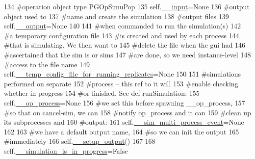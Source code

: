 \begin{DoxyCode}
134         \textcolor{comment}{#operation object type PGOpSimuPop}
135         self.\hyperlink{classnegui_1_1pgguisimupop_1_1PGGuiSimuPop_a0b9f7d933b428393d34105828600a007}{\_\_input}=\textcolor{keywordtype}{None}
136         \textcolor{comment}{#output object used to}
137         \textcolor{comment}{#name and create the simulation}
138         \textcolor{comment}{#output files}
139         self.\hyperlink{classnegui_1_1pgguisimupop_1_1PGGuiSimuPop_a30f6eabf78230001520f90cb36de339f}{\_\_output}=\textcolor{keywordtype}{None}
140 
141         \textcolor{comment}{#when commanded to run the simulation(s)}
142         \textcolor{comment}{#a temporary configuration file}
143         \textcolor{comment}{#is created and used by each process}
144         \textcolor{comment}{#that is simulating.  We then want to}
145         \textcolor{comment}{#delete the file when the gui had }
146         \textcolor{comment}{#ascertained that the sim is or sims}
147         \textcolor{comment}{#are done, so we need instance-level}
148         \textcolor{comment}{#access to the file name}
149         self.\hyperlink{classnegui_1_1pgguisimupop_1_1PGGuiSimuPop_a60c4be477f462c6981a08c479c20a893}{\_\_temp\_config\_file\_for\_running\_replicates}=\textcolor{keywordtype}{None}
150 
151         \textcolor{comment}{#simulations performed on separate}
152         \textcolor{comment}{#process -- this ref to it will}
153         \textcolor{comment}{#enable checking whether in progress}
154         \textcolor{comment}{#or finished.  See def runSimulation:}
155         self.\hyperlink{classnegui_1_1pgguisimupop_1_1PGGuiSimuPop_acdcfde3516741c64806c6881f65c6f4e}{\_\_op\_process}=\textcolor{keywordtype}{None}
156         \textcolor{comment}{#we set this before spawning \_\_op\_process,}
157         \textcolor{comment}{#so that on cancel-sim, we can}
158         \textcolor{comment}{#notify op\_process and it can }
159         \textcolor{comment}{#clean up its subprocesses and }
160         \textcolor{comment}{#output:}
161         self.\hyperlink{classnegui_1_1pgguisimupop_1_1PGGuiSimuPop_a02ccc7da9aec67e8e13e083001aba15b}{\_\_sim\_multi\_process\_event}=\textcolor{keywordtype}{None}
162 
163         \textcolor{comment}{#we have a default output name,}
164         \textcolor{comment}{#so we can init the output}
165         \textcolor{comment}{#immediately}
166         self.\hyperlink{classnegui_1_1pgguisimupop_1_1PGGuiSimuPop_a23913431472d154054d66ab5e72daf0e}{\_\_setup\_output}()
167 
168         self.\hyperlink{classnegui_1_1pgguisimupop_1_1PGGuiSimuPop_a5064bac64c69bd13fe1366b21f1f7ad9}{\_\_simulation\_is\_in\_progress}=\textcolor{keyword}{False}

\end{DoxyCode}
